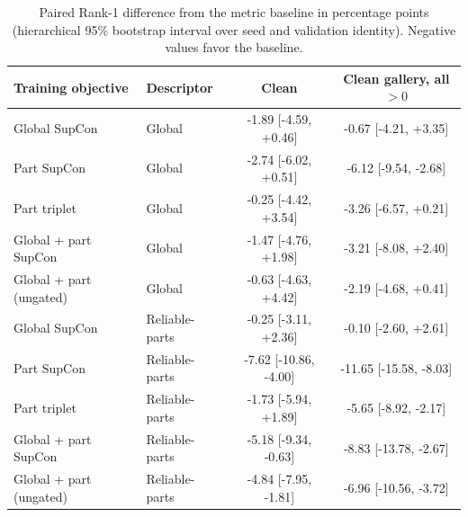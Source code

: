 \documentclass[runningheads]{llncs}
\begin{document}
\begin{table}[!t]
\centering
\caption{Paired Rank-1 difference from the metric baseline in percentage points
(hierarchical 95\% bootstrap interval over seed and validation identity).
Negative values favor the baseline.}
\label{tab:paired-results}
\small
\setlength{\tabcolsep}{4pt}
\begin{tabularx}{\textwidth}{@{}>{\raggedright\arraybackslash}Xlcc@{}}
\toprule
Training objective & Descriptor & Clean & \shortstack{Clean gallery,\\all $>0$} \\
\midrule
Global SupCon & Global & -1.89 [-4.59, +0.46] & -0.67 [-4.21, +3.35] \\
Part SupCon & Global & -2.74 [-6.02, +0.51] & -6.12 [-9.54, -2.68] \\
Part triplet & Global & -0.25 [-4.42, +3.54] & -3.26 [-6.57, +0.21] \\
Global + part SupCon & Global & -1.47 [-4.76, +1.98] & -3.21 [-8.08, +2.40] \\
Global + part (ungated) & Global & -0.63 [-4.63, +4.42] & -2.19 [-4.68, +0.41] \\
Global SupCon & Reliable-parts & -0.25 [-3.11, +2.36] & -0.10 [-2.60, +2.61] \\
Part SupCon & Reliable-parts & -7.62 [-10.86, -4.00] & -11.65 [-15.58, -8.03] \\
Part triplet & Reliable-parts & -1.73 [-5.94, +1.89] & -5.65 [-8.92, -2.17] \\
Global + part SupCon & Reliable-parts & -5.18 [-9.34, -0.63] & -8.83 [-13.78, -2.67] \\
Global + part (ungated) & Reliable-parts & -4.84 [-7.95, -1.81] & -6.96 [-10.56, -3.72] \\
\bottomrule
\end{tabularx}
\vspace{0.5em}


\end{table}
\end{document}
